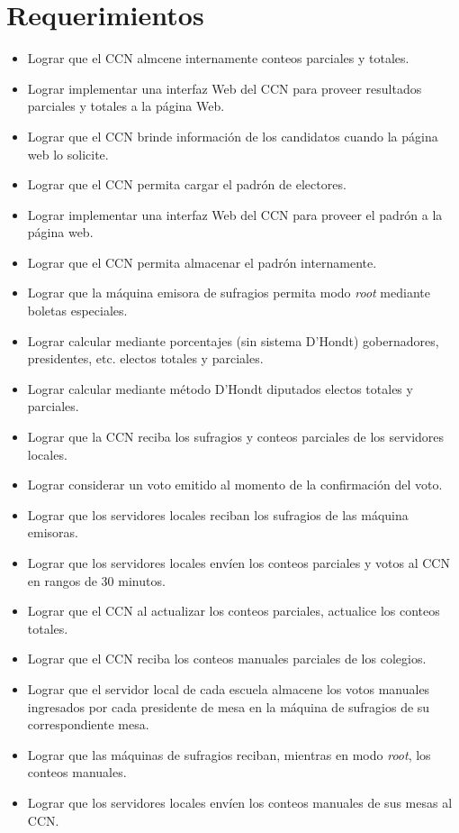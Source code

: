 \documentclass[spanish, 10pt,a4paper]{article}
\numberwithin{equation}{section} %
\begin{document}
\section{Requerimientos}
\begin{itemize}
\item Lograr que el CCN almcene internamente conteos parciales y totales.
\item Lograr implementar una interfaz Web del CCN para proveer resultados parciales y totales a la página Web.
\item Lograr que el CCN brinde información de los candidatos cuando la página web lo solicite.
\item Lograr que el CCN permita cargar el padrón de electores.
\item Lograr implementar una interfaz Web del CCN para proveer el padrón a la página web.
\item Lograr que el CCN permita almacenar el padrón internamente.
\item Lograr que la máquina emisora de sufragios permita modo \emph{root} mediante boletas especiales.
\item Lograr calcular mediante porcentajes (sin sistema D'Hondt) gobernadores, presidentes, etc. electos totales y parciales.
\item Lograr calcular mediante método D'Hondt diputados electos totales y parciales.
\item Lograr que la CCN reciba los sufragios y conteos parciales de los servidores locales.
\item Lograr considerar un voto emitido al momento de la confirmación del voto.
\item Lograr que los servidores locales reciban los sufragios de las máquina emisoras.
\item Lograr que los servidores locales envíen los conteos parciales y votos al CCN en rangos de 30 minutos.
\item Lograr que el CCN al actualizar los conteos parciales, actualice los conteos totales.
\item Lograr que el CCN reciba los conteos manuales parciales de los colegios.
\item Lograr que el servidor local de cada escuela almacene los votos manuales ingresados por cada presidente de mesa en la máquina de sufragios de su correspondiente mesa.
\item Lograr que las máquinas de sufragios reciban, mientras en modo \emph{root}, los conteos manuales.
\item Lograr que los servidores locales envíen los conteos manuales de sus mesas al CCN.

\end{itemize}
\end{document}
